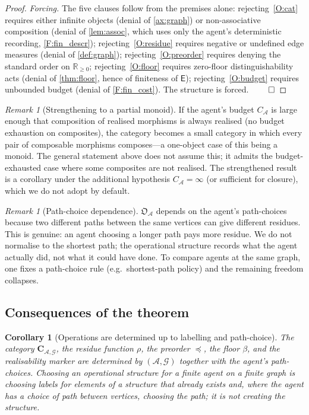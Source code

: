\documentclass[11pt,twocolumn,a4paper]{article}
\theoremstyle{thmstyle}
\newtheorem{corollary}[theorem]{Corollary}
\theoremstyle{definition}
\theoremstyle{remark}
\newtheorem{remark}[theorem]{Remark}
\newcommand{\R}{\mathbb{R}}
\newcommand{\Graph}{\mathcal{G}}
\newcommand{\Edg}{\mathsf{E}}
\newcommand{\Agent}{\mathcal{A}}
\newcommand{\Res}{\rho}
\newcommand{\floor}{\beta}
\newcommand{\OpStr}{\mathfrak{O}}
\begin{document}
\begin{proof}
\emph{Forcing.} The five clauses follow from the premises alone:
rejecting~\ref{O:cat} requires either infinite objects (denial of
\cref{ax:graph}) or non-associative composition (denial of
\cref{lem:assoc}, which uses only the agent's deterministic
recording, \cref{F:fin_descr});
rejecting~\ref{O:residue} requires negative or undefined edge
measures (denial of \cref{def:graph});
rejecting~\ref{O:preorder} requires denying the standard order on
$\R_{\geq 0}$;
rejecting~\ref{O:floor} requires zero-floor distinguishability acts
(denial of \cref{thm:floor}, hence of finiteness of $\Edg$);
rejecting~\ref{O:budget} requires unbounded budget (denial of
\cref{F:fin_cost}). The structure is forced. $\qed$
\end{proof}

\begin{remark}[Strengthening to a partial monoid]
\label{rem:partial_monoid}
If the agent's budget $C_\Agent$ is large enough that composition
of realised morphisms is always realised (no budget exhaustion on
composites), the category becomes a small category in which every
pair of composable morphisms composes---a one-object case of this
being a monoid. The general statement above does not assume this;
it admits the budget-exhausted case where some composites are not
realised. The strengthened result is a corollary under the
additional hypothesis $C_\Agent = \infty$ (or sufficient for
closure), which we do not adopt by default.
\end{remark}

\begin{remark}[Path-choice dependence]
\label{rem:path_choice}
$\OpStr_\Agent$ depends on the agent's path-choices because two
different paths between the same vertices can give different
residues. This is genuine: an agent choosing a longer path pays
more residue. We do not normalise to the shortest path; the
operational structure records what the agent actually did, not
what it could have done. To compare agents at the same graph, one
fixes a path-choice rule (e.g.~shortest-path policy) and the
remaining freedom collapses.
\end{remark}

\subsection{Consequences of the theorem}

\begin{corollary}[Operations are determined up to labelling and
path-choice]
\label{cor:not_chosen}
The category $\mathbf{C}_{\Agent,\Graph}$, the residue function
$\Res$, the preorder $\preceq$, the floor $\floor$, and the
realisability marker are determined by $(\Agent, \Graph)$ together
with the agent's path-choices. Choosing an operational structure
for a finite agent on a finite graph is choosing labels for
elements of a structure that already exists and, where the agent
has a choice of path between vertices, choosing the path; it is
not creating the structure.
\end{corollary}
\end{document}

